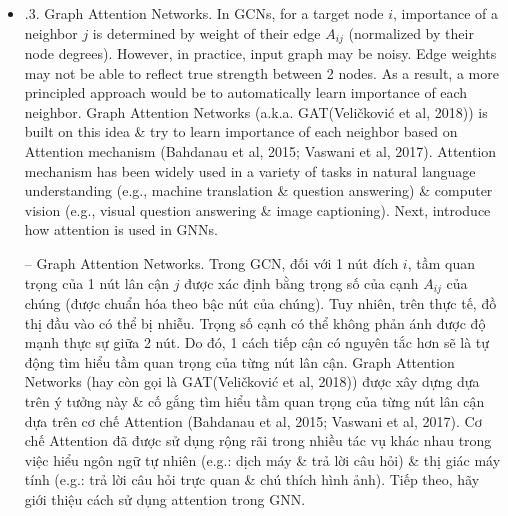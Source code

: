 \documentclass{article}
\begin{document}
\begin{itemize}
\begin{itemize}
\begin{itemize}
            {\bf Connections with Spectral Graph Convolutions.} Discuss connections between GGNs \& traditional spectral filters defined on graphs (Defferrard et al, 2016). Spectral convolutions on graphs can be defined as a multiplication of a node-wise signal ${\bf x}\in\mathbb{R}^N$ with a convoutional filter $g_\theta = {\rm diag}\theta$ ($\theta\in\mathbb{R}^N$: parameter of filter) in Fourier domain. Mathematically, (4.8)
            \begin{equation*}
                g_\theta\star{\bf x} = Ug_\theta U^\top{\bf x}.
            \end{equation*}
            $U$ represents matrix of eigenvectors of normalized graph Laplacian matrix $L = I_N - D^{-\frac{1}{2}}AD^{-\frac{1}{2}}$. $L = U\Lambda U^\top$, $\Lambda$: a diagonal matrix of eigenvalues, \& $U^\top{\bf x}$: graph Fourier transform of input signal ${\bf x}$. In practice, $g_\theta$ can be understood as a function of eigenvalues of normalized graph Laplacian matrix $L$, i.e., $g_\theta(\Lambda)$. [A lot of rigorous mathematical formulas] p. 45+++

            \item {.3. Graph Attention Networks.} In GCNs, for a target node $i$, importance of a neighbor $j$ is determined by weight of their edge $A_{ij}$ (normalized by their node degrees). However, in practice, input graph may be noisy. Edge weights may not be able to reflect true strength between 2 nodes. As a result, a more principled approach would be to automatically learn importance of each neighbor. Graph Attention Networks (a.k.a. GAT(Veličković et al, 2018)) is built on this idea \& try to learn importance of each neighbor based on Attention mechanism (Bahdanau et al, 2015; Vaswani et al, 2017). Attention mechanism has been widely used in a variety of tasks in natural language understanding (e.g., machine translation \& question answering) \& computer vision (e.g., visual question answering \& image captioning). Next, introduce how attention is used in GNNs.

            -- {\sf Graph Attention Networks.} Trong GCN, đối với 1 nút đích $i$, tầm quan trọng của 1 nút lân cận $j$ được xác định bằng trọng số của cạnh $A_{ij}$ của chúng (được chuẩn hóa theo bậc nút của chúng). Tuy nhiên, trên thực tế, đồ thị đầu vào có thể bị nhiễu. Trọng số cạnh có thể không phản ánh được độ mạnh thực sự giữa 2 nút. Do đó, 1 cách tiếp cận có nguyên tắc hơn sẽ là tự động tìm hiểu tầm quan trọng của từng nút lân cận. Graph Attention Networks (hay còn gọi là GAT(Veličković et al, 2018)) được xây dựng dựa trên ý tưởng này \& cố gắng tìm hiểu tầm quan trọng của từng nút lân cận dựa trên cơ chế Attention (Bahdanau et al, 2015; Vaswani et al, 2017). Cơ chế Attention đã được sử dụng rộng rãi trong nhiều tác vụ khác nhau trong việc hiểu ngôn ngữ tự nhiên (e.g.: dịch máy \& trả lời câu hỏi) \& thị giác máy tính (e.g.: trả lời câu hỏi trực quan \& chú thích hình ảnh). Tiếp theo, hãy giới thiệu cách sử dụng attention trong GNN.


\end{itemize}
\end{itemize}
\end{itemize}
\end{document}
